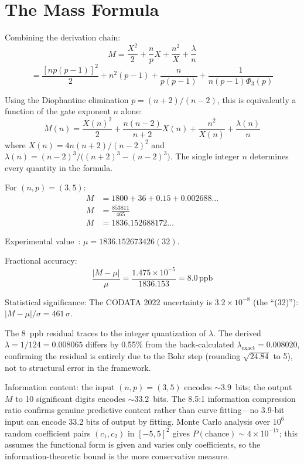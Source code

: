 \documentclass[12pt,a4paper]{article}
\theoremstyle{definition}
\newcommand{\Phithree}{\Phi_3}
\newcommand{\ppb}{\,\mathrm{ppb}}
\begin{document}
\section{The Mass Formula}

Combining the derivation chain:
\begin{equation}\label{eq:mass-formula}
  M = \frac{X^2}{2} + \frac{n}{p}X + \frac{n^2}{X} + \frac{\lambda}{n}
\end{equation}
\[
  = \frac{[np(p-1)]^2}{2} + n^2(p-1) + \frac{n}{p(p-1)}
    + \frac{1}{n(p-1)\Phithree(p)}
\]

Using the Diophantine elimination $p = (n+2)/(n-2)$, this is equivalently
a function of the gate exponent $n$ alone:
\begin{equation}\label{eq:mass-n-only}
  M(n) = \frac{X(n)^2}{2} + \frac{n(n-2)}{n+2}X(n) + \frac{n^2}{X(n)}
         + \frac{\lambda(n)}{n}
\end{equation}
where $X(n) = 4n(n+2)/(n-2)^2$ and
$\lambda(n) = (n-2)^3/\bigl((n+2)^3 - (n-2)^3\bigr)$.
The single integer $n$ determines every quantity in the formula.

For $(n, p) = (3, 5)$:
\begin{align}
  M &= 1800 + 36 + 0.15 + 0.002688\ldots \nonumber \\
  M &= \frac{853811}{465} \label{eq:M-exact} \\
  M &= 1836.152688172\ldots \nonumber
\end{align}

Experimental value~\cite{codata2022}: $\mu = 1836.152673426(32)$.

Fractional accuracy:
\[
  \frac{|M - \mu|}{\mu} = \frac{1.475 \times 10^{-5}}{1836.153} = 8.0\ppb
\]

Statistical significance: The CODATA 2022 uncertainty is $3.2 \times 10^{-8}$
(the ``(32)''): $|M - \mu|/\sigma = 461\,\sigma$.

The 8~ppb residual traces to the integer quantization of $\lambda$.
The derived $\lambda = 1/124 = 0.008065$ differs by 0.55\% from the
back-calculated $\lambda_\mathrm{exact} = 0.008020$, confirming the
residual is entirely due to the Bohr step (rounding $\sqrt{24.84}$ to 5),
not to structural error in the framework.

Information content: the input $(n, p) = (3, 5)$ encodes ${\sim}3.9$~bits;
the output $M$ to 10 significant digits encodes ${\sim}33.2$~bits. The
8.5:1 information compression ratio confirms genuine predictive content
rather than curve fitting---no 3.9-bit input can encode 33.2 bits of
output by fitting. Monte Carlo analysis over $10^6$ random coefficient
pairs $(c_1, c_2)$ in $[-5, 5]^2$ gives
$P(\mathrm{chance}) \sim 4 \times 10^{-17}$; this assumes the functional
form is given and varies only coefficients, so the information-theoretic
bound is the more conservative measure.
\end{document}
